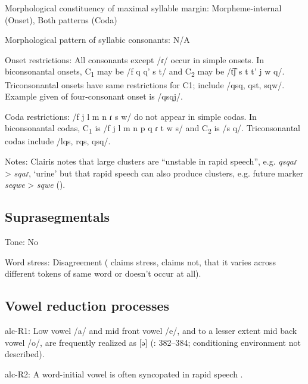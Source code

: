 {\begin{appendixdesc}
\item[Morphological constituency of maximal syllable margin:] Morpheme-internal (Onset), Both patterns (Coda)

\item[Morphological pattern of syllabic consonants:] N/A

\item[Onset restrictions:] All consonants except /ɾ/ occur in simple onsets. In biconsonantal onsets, C\textsubscript{1} may be /f q q' s t/ and C\textsubscript{2} may be /t͡ʃ s t t' j w q/. Triconsonantal onsets have same restrictions for C1; include /qsq, qst, sqw/. Example given of four-consonant onset is /qsqj/.

\item[Coda restrictions:] /f j l m n ɾ s w/ do not appear in simple codas. In biconsonantal codas, C\textsubscript{1} is /f j l m n p q ɾ t w s/ and C\textsubscript{2} is /s q/. Triconsonantal codas include /lqs, rqs, qsq/.

\item[Notes:] Clairis notes that large clusters are “unstable in rapid speech”, e.g. \textit{qsqaɾ} > \textit{sqaɾ}, ‘urine’ but that rapid speech can also produce clusters, e.g. future marker \textit{seqwe} > \textit{sqwe} (\citeyear[393]{Clairis1985}).
\end{appendixdesc}
\subsection*{Suprasegmentals}
\begin{appendixdesc}
\item[Tone:] No

\item[Word stress:] Disagreement (\citealt{Clairis1977} claims stress, \citealt{Clairis1985} claims not, that it varies across different tokens of same word or doesn’t occur at all).
\end{appendixdesc}
\subsection*{Vowel reduction processes}
\begin{appendixdesc}
\item[alc-R1:] Low vowel /a/ and mid front vowel /e/, and to a lesser extent mid back vowel /o/, are frequently realized as [ə] (\citealt{Clairis1985}: 382--384; conditioning environment not described).

\item[alc-R2:] A word-initial vowel is often syncopated in rapid speech \citep[393]{Clairis1985}.


\end{appendixdesc}}
